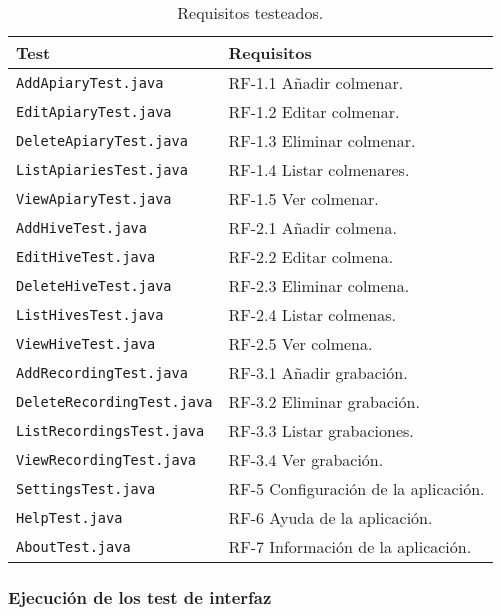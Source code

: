 \begin{table}[H]
\centering
\begin{tabular}{ll}
\toprule
Test                     & Requisitos                           \\
\midrule
\texttt{AddApiaryTest.java}       & RF-1.1 Añadir colmenar.              \\
\texttt{EditApiaryTest.java}      & RF-1.2 Editar colmenar.              \\
\texttt{DeleteApiaryTest.java}    & RF-1.3 Eliminar colmenar.            \\
\texttt{ListApiariesTest.java}    & RF-1.4 Listar colmenares.            \\
\texttt{ViewApiaryTest.java}      & RF-1.5 Ver colmenar.                 \\
\texttt{AddHiveTest.java}         & RF-2.1 Añadir colmena.               \\
\texttt{EditHiveTest.java}        & RF-2.2 Editar colmena.               \\
\texttt{DeleteHiveTest.java}      & RF-2.3 Eliminar colmena.             \\
\texttt{ListHivesTest.java}       & RF-2.4 Listar colmenas.              \\
\texttt{ViewHiveTest.java}        & RF-2.5 Ver colmena.                  \\
\texttt{AddRecordingTest.java}    & RF-3.1 Añadir grabación.             \\
\texttt{DeleteRecordingTest.java} & RF-3.2 Eliminar grabación.           \\
\texttt{ListRecordingsTest.java}  & RF-3.3 Listar grabaciones.           \\
\texttt{ViewRecordingTest.java}   & RF-3.4 Ver grabación.                \\
\texttt{SettingsTest.java}        & RF-5 Configuración de la aplicación. \\
\texttt{HelpTest.java}            & RF-6 Ayuda de la aplicación.         \\
\texttt{AboutTest.java}           & RF-7 Información de la aplicación.  \\
\bottomrule
\end{tabular}
\caption{Requisitos testeados.}
\label{requisitos-test}
\end{table}

\subsubsection{Ejecución de los test de
interfaz}\label{ejecucion-de-los-test-de-interfaz}

